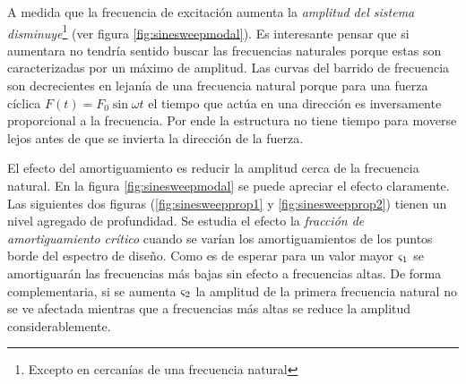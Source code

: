 \documentclass[onecolumn,10pt,titlepage,a4paper]{article}
\begin{document}
A medida que la frecuencia de excitación aumenta la \textit{amplitud del sistema disminuye}\footnote{Excepto en cercanías de una frecuencia natural} (ver figura \ref{fig:sinesweepmodal}). Es interesante pensar que si aumentara no tendría sentido buscar las frecuencias naturales porque estas son caracterizadas por un máximo de amplitud. Las curvas del barrido de frecuencia son decrecientes en lejanía de una frecuencia natural porque para una fuerza cíclica $F(t)=F_0\sin \omega t$ el tiempo que actúa en una dirección es inversamente proporcional a la frecuencia. Por ende la estructura no tiene tiempo para moverse lejos antes de que se invierta la dirección de la fuerza.

El efecto del amortiguamiento es reducir la amplitud cerca de la frecuencia natural. En la figura \ref{fig:sinesweepmodal} se puede apreciar el efecto claramente. Las siguientes dos figuras (\ref{fig:sinesweepprop1} y \ref{fig:sinesweepprop2}) tienen un nivel agregado de profundidad. Se estudia el efecto la \textit{fracción de amortiguamiento crítico} \cite{cook2007concepts} cuando se varían los amortiguamientos de los puntos borde del espectro de diseño. Como es de esperar para un valor mayor $\varsigma_1$ se amortiguarán las frecuencias más bajas sin efecto a frecuencias altas. De forma complementaria, si se aumenta $\varsigma_2$ la amplitud de la primera frecuencia natural no se ve afectada mientras que a frecuencias más altas se reduce la amplitud considerablemente.


 
\end{document}
